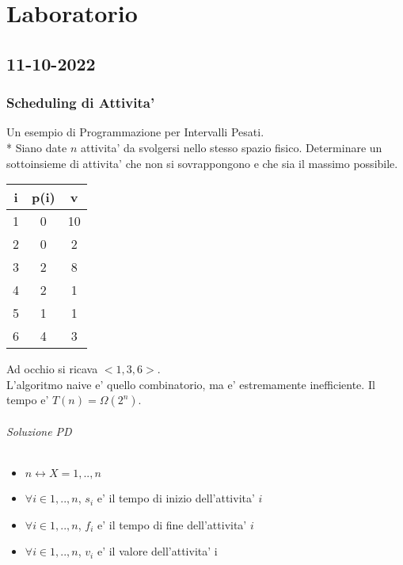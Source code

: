 \part{Laboratorio}
\newcommand{\R}{\mathbb{R}}

\chapter{11-10-2022}

\section{Scheduling di Attivita'}
Un esempio di Programmazione per Intervalli Pesati. \\*
Siano date $n$ attivita' da svolgersi nello stesso spazio fisico.
Determinare un sottoinsieme di attivita' che non si sovrappongono e che sia il massimo possibile.

\begin{center}
    \begin{tabular}{||c c c||}
        \hline
        i & p(i) & v \\
        \hline
        \hline
        1 & 0 & 10 \\
        \hline
        2 & 0 & 2 \\
        \hline
        3 & 2 & 8 \\
        \hline
        4 & 2 & 1 \\
        \hline
        5 & 1 & 1 \\
        \hline
        6 & 4 & 3 \\
        \hline
    \end{tabular}
\end{center}

Ad occhio si ricava $<1, 3, 6>$. \\

L'algoritmo naive e' quello combinatorio, ma e' estremamente inefficiente. Il tempo e' $T(n) = \Omega(2^n)$.

\paragraph{Soluzione PD}

\begin{itemize}
    \item $n \leftrightarrow X = {1,..,n}$
    \item $\forall i \in {1,..,n}$, $s _ {i}$ e' il tempo di inizio dell'attivita' $i$
    \item $\forall i \in {1,..,n}$, $f _ {i}$ e' il tempo di fine dell'attivita' $i$
    \item $\forall i \in {1,..,n}$, $v _ {i}$ e' il valore dell'attivita' i
\end{itemize}

